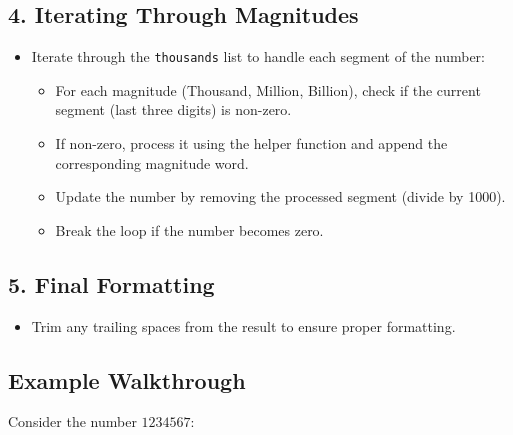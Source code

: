\subsection*{4. Iterating Through Magnitudes}

\begin{itemize}
    \item Iterate through the \texttt{thousands} list to handle each segment of the number:
    \begin{itemize}
        \item For each magnitude (Thousand, Million, Billion), check if the current segment (last three digits) is non-zero.
        \item If non-zero, process it using the helper function and append the corresponding magnitude word.
        \item Update the number by removing the processed segment (divide by 1000).
        \item Break the loop if the number becomes zero.
    \end{itemize}
\end{itemize}

\subsection*{5. Final Formatting}

\begin{itemize}
    \item Trim any trailing spaces from the result to ensure proper formatting.
\end{itemize}

\subsection*{Example Walkthrough}

Consider the number \(1234567\):

